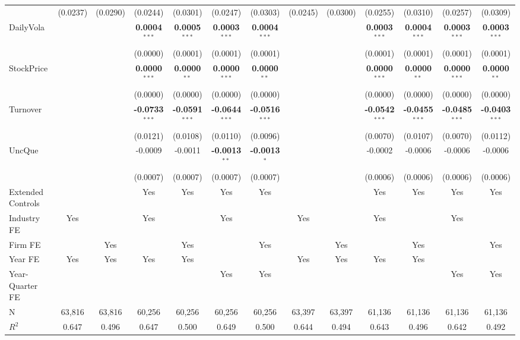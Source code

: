 \documentclass[11pt,a4paper]{article}
\begin{document}
\begin{table}[htbp]
\begin{tabular}{lcccccccccccc}
 & (0.0237) & (0.0290) & (0.0244) & (0.0301) & (0.0247) & (0.0303) & (0.0245) & (0.0300) & (0.0255) & (0.0310) & (0.0257) & (0.0309) \\
DailyVola &  &  & \textbf{0.0004}$^{***}$ & \textbf{0.0005}$^{***}$ & \textbf{0.0003}$^{***}$ & \textbf{0.0004}$^{***}$ &  &  & \textbf{0.0003}$^{***}$ & \textbf{0.0004}$^{***}$ & \textbf{0.0003}$^{***}$ & \textbf{0.0003}$^{***}$ \\
 &  &  & (0.0000) & (0.0001) & (0.0001) & (0.0001) &  &  & (0.0001) & (0.0001) & (0.0001) & (0.0001) \\
StockPrice &  &  & \textbf{0.0000}$^{***}$ & \textbf{0.0000}$^{**}$ & \textbf{0.0000}$^{***}$ & \textbf{0.0000}$^{**}$ &  &  & \textbf{0.0000}$^{***}$ & \textbf{0.0000}$^{**}$ & \textbf{0.0000}$^{***}$ & \textbf{0.0000}$^{**}$ \\
 &  &  & (0.0000) & (0.0000) & (0.0000) & (0.0000) &  &  & (0.0000) & (0.0000) & (0.0000) & (0.0000) \\
Turnover &  &  & \textbf{-0.0733}$^{***}$ & \textbf{-0.0591}$^{***}$ & \textbf{-0.0644}$^{***}$ & \textbf{-0.0516}$^{***}$ &  &  & \textbf{-0.0542}$^{***}$ & \textbf{-0.0455}$^{***}$ & \textbf{-0.0485}$^{***}$ & \textbf{-0.0403}$^{***}$ \\
 &  &  & (0.0121) & (0.0108) & (0.0110) & (0.0096) &  &  & (0.0070) & (0.0107) & (0.0070) & (0.0112) \\
UncQue &  &  & -0.0009 & -0.0011 & \textbf{-0.0013}$^{**}$ & \textbf{-0.0013}$^{*}$ &  &  & -0.0002 & -0.0006 & -0.0006 & -0.0006 \\
 &  &  & (0.0007) & (0.0007) & (0.0007) & (0.0007) &  &  & (0.0006) & (0.0006) & (0.0006) & (0.0006) \\
\midrule
Extended Controls &  &  & Yes & Yes & Yes & Yes &  &  & Yes & Yes & Yes & Yes \\
Industry FE & Yes &  & Yes &  & Yes &  & Yes &  & Yes &  & Yes &  \\
Firm FE &  & Yes &  & Yes &  & Yes &  & Yes &  & Yes &  & Yes \\
Year FE & Yes & Yes & Yes & Yes &  &  & Yes & Yes & Yes & Yes &  &  \\
Year-Quarter FE &  &  &  &  & Yes & Yes &  &  &  &  & Yes & Yes \\
\midrule
N & 63,816 & 63,816 & 60,256 & 60,256 & 60,256 & 60,256 & 63,397 & 63,397 & 61,136 & 61,136 & 61,136 & 61,136 \\
$R^2$ & 0.647 & 0.496 & 0.647 & 0.500 & 0.649 & 0.500 & 0.644 & 0.494 & 0.643 & 0.496 & 0.642 & 0.492 \\

\end{tabular}
\end{table}
\end{document}
